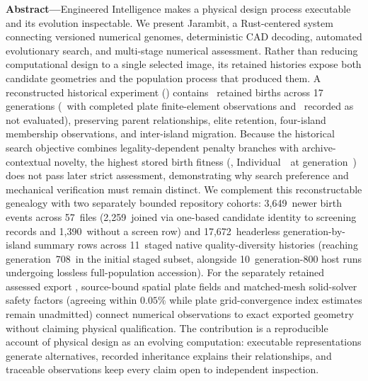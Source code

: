 \documentclass[10pt,journal,letterpaper]{IEEEtran}
\newcommand{\code}[1]{{\small\texttt{\detokenize{#1}}}}
\providecommand{\NewerBirthFilesCount}{57}
\providecommand{\NewerBirthEventsCount}{3,649}
\providecommand{\NewerScreenRowsCount}{2,259}
\providecommand{\NewerUnscreenedBirthsCount}{1,390}
\providecommand{\NativeSummaryFilesCount}{11}
\providecommand{\NativeSummaryRowsCount}{17,672}
\providecommand{\NativeLongestRetainedGen}{708}
\providecommand{\CompletedGenEightHundredRunsCount}{10}
\begin{document}
\noindent\textbf{Abstract---}Engineered Intelligence makes a physical design process executable and its evolution inspectable. We present Jarambit, a Rust-centered system connecting versioned numerical genomes, deterministic CAD decoding, automated evolutionary search, and multi-stage numerical assessment. Rather than reducing computational design to a single selected image, its retained histories expose both candidate geometries and the population process that produced them. A reconstructed historical experiment (\code{w282\_ultrarunner}) contains \BirthCount\ retained births across 17 generations (\FemComplete\ with completed plate finite-element observations and \FemNotEvaluated\ recorded as not evaluated), preserving parent relationships, elite retention, four-island membership observations, and inter-island migration. Because the historical search objective combines legality-dependent penalty branches with archive-contextual novelty, the highest stored birth fitness (\HistoricalBestFit, Individual~\HistoricalBestId\ at generation~\HistoricalBestGeneration) does not pass later strict assessment, demonstrating why search preference and mechanical verification must remain distinct. We complement this reconstructable genealogy with two separately bounded repository cohorts: \NewerBirthEventsCount\ newer birth events across \NewerBirthFilesCount\ files (\NewerScreenRowsCount\ joined via one-based candidate identity to screening records and \NewerUnscreenedBirthsCount\ without a screen row) and \NativeSummaryRowsCount\ headerless generation-by-island summary rows across \NativeSummaryFilesCount\ staged native quality-diversity histories (reaching generation~\NativeLongestRetainedGen\ in the initial staged subset, alongside \CompletedGenEightHundredRunsCount\ generation-800 host runs undergoing lossless full-population accession). For the separately retained assessed export \code{cert\_pipeline\_r01\_p14\_c02}, source-bound spatial plate fields and matched-mesh solid-solver safety factors (agreeing within $0.05\%$ while plate grid-convergence index estimates remain unadmitted) connect numerical observations to exact exported geometry without claiming physical qualification. The contribution is a reproducible account of physical design as an evolving computation: executable representations generate alternatives, recorded inheritance explains their relationships, and traceable observations keep every claim open to independent inspection.
\par\vspace{2.5mm}
\end{document}
